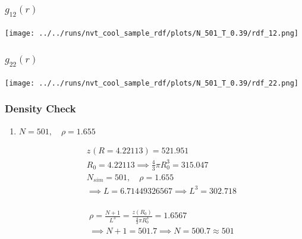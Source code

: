 \documentclass[a4paper,11pt,twoside]{article}
\begin{document}
\subsubsection{\(g_{12}(r)\)}
\label{sec:org68b981a}

\begin{center}
\texttt{[image: ../../runs/nvt\_cool\_sample\_rdf/plots/N\_501\_T\_0.39/rdf\_12.png]}
\end{center}
\subsubsection{\(g_{22}(r)\)}
\label{sec:orgd36fe60}

\begin{center}
\texttt{[image: ../../runs/nvt\_cool\_sample\_rdf/plots/N\_501\_T\_0.39/rdf\_22.png]}
\end{center}
\subsubsection{Density Check}
\label{sec:orgb7e12f9}
\begin{enumerate}
\item \(N = 501, \quad \rho = 1.655\)
\label{sec:orgc5d6d0e}

\begin{align*}
z_{}(R = 4.22113) = 521.951 \\
R_0 = 4.22113 \implies \frac{4}{3}\pi R_0^3 = 315.047 \\
N_{sim} = 501, \quad \rho = 1.655 \\
\implies L = 6.71449326567 \implies L^3 = 302.718 \\
\end{align*}

\begin{align*}
\rho = \frac{N + 1}{L^3} = \frac{z(R_0)}{\frac{4}{3}\pi R_0^3} = 1.6567 \\
\implies N + 1 = 501.7 \implies N = 500.7 \approx 501
\end{align*}
\end{enumerate}
\end{document}
